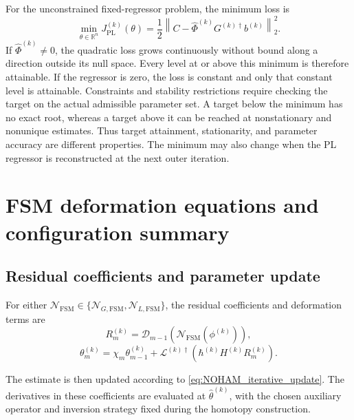 \documentclass[11pt]{article}
\theoremstyle{remark}
\begin{document}
For the unconstrained fixed-regressor problem, the minimum loss is
\[
    \min_{\theta\in\mathbb R^n}J_{\mathrm{PL}}^{(k)}(\theta)
    =\frac12\left\|C-\hat\Phi^{(k)}G^{(k)\dagger}b^{(k)}\right\|_2^2.
\]
If $\hat\Phi^{(k)}\ne0$, the quadratic loss grows continuously
without bound along a direction outside its null space. Every
level at or above this minimum is therefore attainable. If the
regressor is zero, the loss is constant and only that constant
level is attainable. Constraints and stability restrictions require
checking the target on the actual admissible parameter set.
A target below the minimum has no exact root, whereas a target
above it can be reached at nonstationary and nonunique estimates.
Thus target attainment, stationarity, and parameter accuracy are
different properties. The minimum may also change when the PL
regressor is reconstructed at the next outer iteration.

\section{FSM deformation equations and configuration summary}
\label{app:gotham_fsm_updates}

\subsection{Residual coefficients and parameter update}

For either
$\mathcal N_{\mathrm{FSM}}\in
\{\mathcal N_{G,\mathrm{FSM}},\mathcal N_{L,\mathrm{FSM}}\}$,
the residual coefficients and deformation terms are
\begin{equation}
\label{eq:FSM_residual_coefficients}
    R_m^{(k)}
    =
    \mathscr{D}_{m-1}
    \left(
    \mathcal{N}_{\mathrm{FSM}}(\phi^{(k)})
    \right),
\end{equation}
\begin{equation}
\label{eq:FSM_GOTHAM_update}
    \theta_m^{(k)}
    =
    \chi_m\theta_{m-1}^{(k)}
    +
    \mathcal{L}^{(k)\dagger}
    \left(
    \hbar^{(k)}H^{(k)}R_m^{(k)}
    \right).
\end{equation}

The estimate is then updated according to
\eqref{eq:NOHAM_iterative_update}. The derivatives in these coefficients
are evaluated at $\hat\theta^{(k)}$, with the chosen auxiliary operator
and inversion strategy fixed during the homotopy construction.
\end{document}
